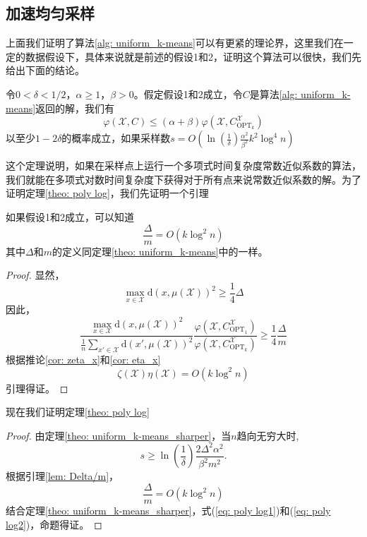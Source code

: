 \subsection{加速均匀采样}
上面我们证明了算法\ref{alg: uniform_k-means}可以有更紧的理论界，这里我们在一定的数据假设下，具体来说就是前述的假设1和2，证明这个算法可以很快，我们先给出下面的结论。
\begin{theorem}
    \label{theo: poly log}
    令$0 < \delta <1/2$，$\alpha \geq 1$，$\beta >0$。假定假设1和2成立，令$C$是算法\ref{alg: uniform_k-means}返回的解，我们有
    \begin{equation*}
    \varphi(\mathcal{X},C) \leq (\alpha + \beta)\varphi(\mathcal{X},C_{\text{OPT}_k}^\mathcal{X})
    \end{equation*}
    以至少$1-2\delta$的概率成立，如果采样数$s = O(\ln(\frac{1}{\delta})\frac{\alpha^2}{\beta^2}k^2\log^4 n)$
\end{theorem}
这个定理说明，如果在采样点上运行一个多项式时间复杂度常数近似系数的算法，我们就能在多项式对数时间复杂度下获得对于所有点来说常数近似系数的解。为了证明定理\ref{theo: poly log}，我们先证明一个引理
\begin{lemma}
    \label{lem: Delta/m}
    如果假设1和2成立，可以知道
    \begin{equation*}
    \frac{\Delta}{m} = O(k\log^2 n)
    \end{equation*}
    其中$\Delta$和$m$的定义同定理\ref{theo: uniform_k-means}中的一样。
\end{lemma}
\begin{proof}
    显然，
    \begin{equation*}
    \max\limits_{x \in \mathcal{X}} \text{d}(x,\mu(\mathcal{X}))^2 \geq \frac{1}{4} \Delta
    \end{equation*}
    因此，
    \begin{equation*}
    \frac{\max\limits_{x \in \mathcal{X}}\text{d}(x,\mu(\mathcal{X}))^2}{\frac{1}{n}\sum_{x' \in \mathcal{X}}\text{d}(x',\mu(\mathcal{X}))^2} \frac{\varphi(\mathcal{X},C_{\text{OPT}_1}^{\mathcal{X}})}{\varphi(\mathcal{X},C_{\text{OPT}_k}^{\mathcal{X}})} \geq \frac{1}{4} \frac{\Delta}{m}
    \end{equation*}
    根据推论\ref{cor: zeta_x}和\ref{cor: eta_x}
    \begin{equation*}
    \zeta(\mathcal{X}) \eta(\mathcal{X}) = O(k\log^2 n) 
    \end{equation*}
    引理得证。
\end{proof}
现在我们证明定理\ref{theo: poly log}
\begin{proof}
    由定理\ref{theo: uniform_k-means_sharper}，当$n$趋向无穷大时,
    \begin{equation}
    \label{eq: poly log1}
    s \geq \ln(\frac{1}{\delta})\frac{2\Delta^2 \alpha^2}{\beta^2 m^2}.
    \end{equation}
    根据引理\ref{lem: Delta/m}，
    \begin{equation}
    \label{eq: poly log2}
    \frac{\Delta}{m} = O(k\log^2 n)
    \end{equation}
    结合定理\ref{theo: uniform_k-means_sharper}，式(\ref{eq: poly log1})和(\ref{eq: poly log2})，命题得证。
\end{proof}

